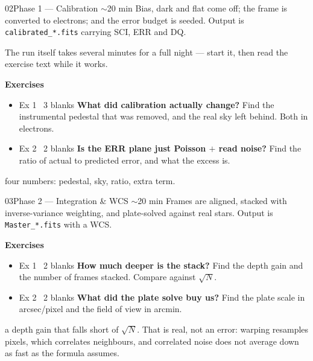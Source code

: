 \documentclass[11pt,a4paper]{article}
\newcommand{\recordline}[2]{%
  \vspace{6pt}{\color{rule}\hrule}\vspace{6pt}%
  \noindent{\sffamily\bfseries\scriptsize\color{accent}\MakeUppercase{#1}}\hspace{6pt}%
  \begin{minipage}[t]{0.78\textwidth}\small #2\end{minipage}}
\begin{document}
\begin{nbbox}{02}{Phase 1 --- Calibration \quad\textnormal{\sffamily\scriptsize\color{inkfaint}$\sim$20 min}}
\small\color{inksoft} Bias, dark and flat come off; the frame is converted to electrons; and the
error budget is seeded. Output is \texttt{calibrated\_*.fits} carrying SCI, ERR and DQ.
\par\vspace{6pt}\color{ink}
The run itself takes several minutes for a full night --- start it, then read the exercise text
while it works.
\vspace{6pt}

{\sffamily\bfseries\small Exercises}
\begin{itemize}
\item[] {\ttfamily\scriptsize\color{inkfaint}Ex 1 \textbullet\ 3 blanks}\quad
\textbf{What did calibration actually change?} Find the instrumental pedestal that was removed,
and the real sky left behind. Both in electrons.
\item[] {\ttfamily\scriptsize\color{inkfaint}Ex 2 \textbullet\ 2 blanks}\quad
\textbf{Is the ERR plane just Poisson $+$ read noise?} Find the ratio of actual to predicted
error, and what the excess is.
\end{itemize}
\recordline{Record}{four numbers: pedestal, sky, ratio, extra term.}
\end{nbbox}

\begin{nbbox}{03}{Phase 2 --- Integration \& WCS \quad\textnormal{\sffamily\scriptsize\color{inkfaint}$\sim$20 min}}
\small\color{inksoft} Frames are aligned, stacked with inverse-variance weighting, and
plate-solved against real stars. Output is \texttt{Master\_*.fits} with a WCS.
\par\vspace{6pt}\color{ink}
{\sffamily\bfseries\small Exercises}
\begin{itemize}
\item[] {\ttfamily\scriptsize\color{inkfaint}Ex 1 \textbullet\ 2 blanks}\quad
\textbf{How much deeper is the stack?} Find the depth gain and the number of frames stacked.
Compare against $\sqrt{N}$.
\item[] {\ttfamily\scriptsize\color{inkfaint}Ex 2 \textbullet\ 2 blanks}\quad
\textbf{What did the plate solve buy us?} Find the plate scale in arcsec/pixel and the field of
view in arcmin.
\end{itemize}
\recordline{Watch for}{a depth gain that falls short of $\sqrt{N}$. That is real, not an
error: warping resamples pixels, which correlates neighbours, and correlated noise does not
average down as fast as the formula assumes.}
\end{nbbox}
\end{document}
